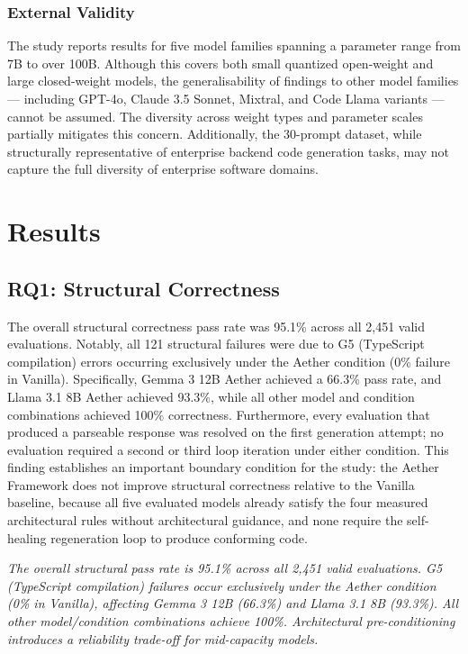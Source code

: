 \documentclass[review,12pt,3p]{elsarticle}
\begin{document}
\subsubsection{External Validity}

The study reports results for five model families spanning a parameter range from 7B to
over 100B. Although this covers both small quantized open-weight and large closed-weight
models, the generalisability of findings to other model families --- including GPT-4o,
Claude 3.5 Sonnet, Mixtral, and Code Llama variants --- cannot be assumed. The diversity
across weight types and parameter scales partially mitigates this concern. Additionally,
the 30-prompt dataset, while structurally representative of enterprise backend code
generation tasks, may not capture the full diversity of enterprise software domains.

\section{Results}
\label{sec:results}

\subsection{RQ1: Structural Correctness}

The overall structural correctness pass rate was 95.1\% across all 2,451 valid evaluations. Notably, all 121 structural failures were due to G5 (TypeScript compilation) errors occurring exclusively under the Aether condition (0\% failure in Vanilla). Specifically, Gemma 3 12B Aether achieved a 66.3\% pass rate, and Llama 3.1 8B Aether achieved 93.3\%, while all other model and condition combinations achieved 100\% correctness. Furthermore, every evaluation that produced a parseable response was
resolved on the first generation attempt; no evaluation required a second or third loop
iteration under either condition. This finding establishes an important boundary condition
for the study: the Aether Framework does not improve structural correctness relative to the
Vanilla baseline, because all five evaluated models already satisfy the
four measured architectural rules without architectural guidance, and none require
the self-healing regeneration loop to produce conforming code.

\begin{tcolorbox}[
  colback=gray!10,
  colframe=black!60,
  title=\textbf{RQ1 Summary},
  fonttitle=\bfseries,
  breakable
]
\textit{The overall structural pass rate is 95.1\% across all 2,451 valid evaluations. G5 (TypeScript compilation) failures occur exclusively under the Aether condition (0\% in Vanilla), affecting Gemma 3 12B (66.3\%) and Llama 3.1 8B (93.3\%). All other model/condition combinations achieve 100\%. Architectural pre-conditioning introduces a reliability trade-off for mid-capacity models.}
\end{tcolorbox}
\end{document}
